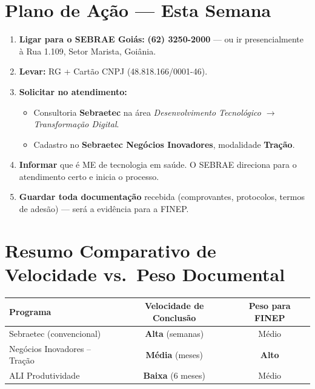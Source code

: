 \documentclass[11pt, a4paper]{article}
\begin{document}
\vspace{4pt}

\section{Plano de Ação --- Esta Semana}

\begin{enumerate}[label=\textcolor{primaryColor}{\textbf{\arabic*.}}, leftmargin=1.8em]
    \item \textbf{Ligar para o SEBRAE Goiás:} \textcolor{primaryColor}{\textbf{(62) 3250-2000}} --- ou ir presencialmente à Rua 1.109, Setor Marista, Goiânia.
    \item \textbf{Levar:} RG + Cartão CNPJ (48.818.166/0001-46).
    \item \textbf{Solicitar no atendimento:}
    \begin{itemize}[label=\textcolor{accentColor}{$\blacktriangleright$}]
        \item Consultoria \textbf{Sebraetec} na área \textit{Desenvolvimento Tecnológico $\to$ Transformação Digital}.
        \item Cadastro no \textbf{Sebraetec Negócios Inovadores}, modalidade \textbf{Tração}.
    \end{itemize}
    \item \textbf{Informar} que é ME de tecnologia em saúde. O SEBRAE direciona para o atendimento certo e inicia o processo.
    \item \textbf{Guardar toda documentação} recebida (comprovantes, protocolos, termos de adesão) --- será a evidência para a FINEP.
\end{enumerate}

\vspace{4pt}

\section{Resumo Comparativo de Velocidade vs.\ Peso Documental}

\begin{table}[H]
    \centering
    \small
    \renewcommand{\arraystretch}{1.3}
    \begin{tabularx}{\textwidth}{@{} X c c @{}}
        \toprule
        \rowcolor{tableHeader} \textbf{Programa} & \textbf{Velocidade de Conclusão} & \textbf{Peso para FINEP} \\
        \midrule
        Sebraetec (convencional) & \textcolor{successGreen}{\textbf{Alta}} (semanas) & Médio \\
        \rowcolor{lightGray}
        Negócios Inovadores -- Tração & \textcolor{warningOrange}{\textbf{Média}} (meses) & \textcolor{successGreen}{\textbf{Alto}} \\
        ALI Produtividade & \textcolor{accentColor}{\textbf{Baixa}} (6 meses) & Médio \\
        \bottomrule
    \end{tabularx}
\end{table}
\end{document}
